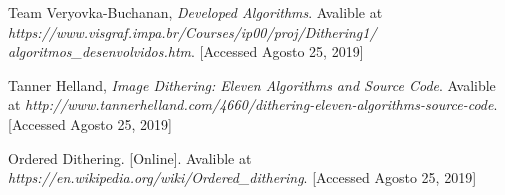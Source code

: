 \documentclass[conference]{IEEEtran}
\begin{document}
\begin{thebibliography}{00}
 Team Veryovka-Buchanan, \textit{Developed Algorithms}. Avalible at \textit{https://www.visgraf.impa.br/Courses/ip00/proj/Dithering1/\\algoritmos\_desenvolvidos.htm}. [Accessed Agosto 25, 2019]

 Tanner Helland, \textit{Image Dithering: Eleven Algorithms and Source Code}. Avalible at \textit{http://www.tannerhelland.com/4660/dithering-eleven-algorithms-source-code}. [Accessed Agosto 25, 2019]

 Ordered Dithering. [Online]. Avalible at \textit{https://en.wikipedia.org/wiki/Ordered\_dithering}. [Accessed Agosto 25, 2019]
\end{thebibliography}


\end{document}
